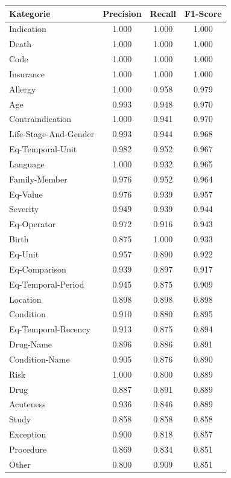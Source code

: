 \begin{table}[htbp]
\centering
\begin{tabular}{p{5cm}ccc}
\toprule
\textbf{Kategorie} & \textbf{Precision} & \textbf{Recall} & \textbf{F1-Score} \\
\midrule
Indication & 1.000 & 1.000 & 1.000 \\
Death & 1.000 & 1.000 & 1.000 \\
Code & 1.000 & 1.000 & 1.000 \\
Insurance & 1.000 & 1.000 & 1.000 \\
Allergy & 1.000 & 0.958 & 0.979 \\
Age & 0.993 & 0.948 & 0.970 \\
Contraindication & 1.000 & 0.941 & 0.970 \\
Life-Stage-And-Gender & 0.993 & 0.944 & 0.968 \\
Eq-Temporal-Unit & 0.982 & 0.952 & 0.967 \\
Language & 1.000 & 0.932 & 0.965 \\
Family-Member & 0.976 & 0.952 & 0.964 \\
Eq-Value & 0.976 & 0.939 & 0.957 \\
Severity & 0.949 & 0.939 & 0.944 \\
Eq-Operator & 0.972 & 0.916 & 0.943 \\
Birth & 0.875 & 1.000 & 0.933 \\
Eq-Unit & 0.957 & 0.890 & 0.922 \\
Eq-Comparison & 0.939 & 0.897 & 0.917 \\
Eq-Temporal-Period & 0.945 & 0.875 & 0.909 \\
Location & 0.898 & 0.898 & 0.898 \\
Condition & 0.910 & 0.880 & 0.895 \\
Eq-Temporal-Recency & 0.913 & 0.875 & 0.894 \\
Drug-Name & 0.896 & 0.886 & 0.891 \\
Condition-Name & 0.905 & 0.876 & 0.890 \\
Risk & 1.000 & 0.800 & 0.889 \\
Drug & 0.887 & 0.891 & 0.889 \\
Acuteness & 0.936 & 0.846 & 0.889 \\
Study & 0.858 & 0.858 & 0.858 \\
Exception & 0.900 & 0.818 & 0.857 \\
Procedure & 0.869 & 0.834 & 0.851 \\
Other & 0.800 & 0.909 & 0.851 \\

\end{tabular}
\end{table}
